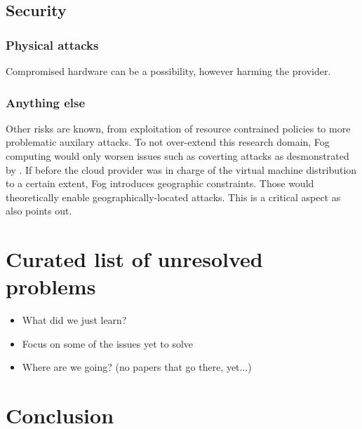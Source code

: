 \documentclass[11pt]{sdm}
\begin{document}
\subsection{Security}
\subsubsection{Physical attacks}
Compromised hardware can be a possibility, however harming the provider.
\subsubsection{Anything else}
Other risks are known, from exploitation of resource contrained policies to more problematic auxilary attacks. To not over-extend this research domain, Fog computing would only worsen issues such as coverting attacks as desmonstrated by \citet{maurice_hello_2017}. If before the cloud provider was in charge of the virtual machine distribution to a certain extent, Fog introduces geographic constraints. Those would theoretically enable geographically-located attacks.
This is a critical aspect as \citet{ieee_standards_association_ieee_2018} also points out.

\section{Curated list of unresolved problems}
\begin{itemize}
    \item What did we just learn?
    \item Focus on some of the issues yet to solve
    \item Where are we going? (no papers that go there, yet...)
\end{itemize}

\section{Conclusion}

\printbibliography 
\end{document}
